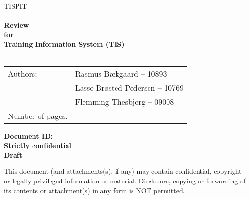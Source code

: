 \documentclass[Main]{subfiles}
\begin{document}
\begin{center}

\textsc{\Large TISPIT}\\[0.5cm]


\HRule \\[0.4cm]

{ \huge \bfseries Review}\\[0.4cm]
{ \huge \bfseries for}\\[0.4cm] 
{ \huge \bfseries Training Information System (TIS)}\\[0.4cm]

\HRule \\[1.5cm]

\begin{tabular}{p{}|p{}}
\hline 
Authors: & Rasmus Bækgaard -- 10893\\ &Lasse Brøsted Pedersen -- 10769\\ &Flemming Thesbjerg -- 09008\\ 
\hline 
Number of pages: & \pageref{LastPage} \\
\hline 
\end{tabular} \vspace{40pt}

\textbf{\Large Document ID: \DocID}\\
\textbf{\Large Strictly confidential}\\
\textbf{\Large Draft}

This document (and attachments(s), if any) may contain confidential, copyright or legally privileged information or material.
Disclosure, copying or forwarding of its contents or attachment(s) in any form is NOT permitted.
\end{center}
\end{document}
